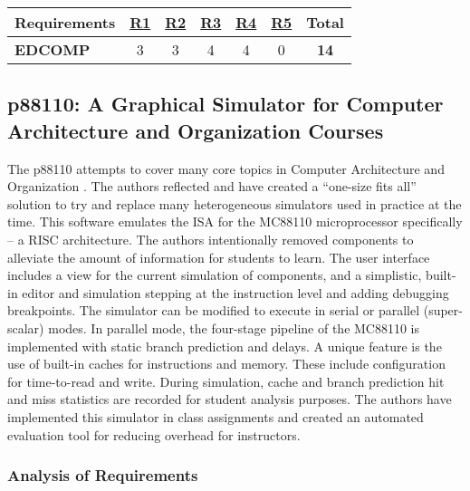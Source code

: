 \begin{table}[h!]
    \centering
    \begin{tabular}{lcccccc}
       \textbf{Requirements} & \textbf{\hyperref[req:personal]{R1}} & \textbf{\hyperref[req:configuration]{R2}} & \textbf{\hyperref[req:pedagogical]{R3}} & \textbf{\hyperref[req:simulations]{R4}} & \textbf{\hyperref[req:modern]{R5}} & \textbf{Total} \\ \hline
       \textbf{EDCOMP \cite{Djordjevic2005}} 
       & 3 & 3 & 4 & 4 & 0 & \textbf{14} \\ 
    \end{tabular}
\end{table}

\subsection{p88110: A Graphical Simulator for Computer Architecture and Organization Courses}
\label{sec:review-p88110}

The p88110 attempts to cover many core topics in Computer Architecture and Organization \cite{Garcia2009}. The authors reflected and have created a ``one-size fits all'' solution to try and replace many heterogeneous simulators used in practice at the time. This software emulates the ISA for the MC88110 microprocessor specifically -- a RISC architecture. The authors intentionally removed components to alleviate the amount of information for students to learn. The user interface includes a view for the current simulation of components, and a simplistic, built-in editor and simulation stepping at the instruction level and adding debugging breakpoints. The simulator can be modified to execute in serial or parallel (super-scalar) modes. In parallel mode, the four-stage pipeline of the MC88110 is implemented with static branch prediction and delays. A unique feature is the use of built-in caches for instructions and memory. These include configuration for time-to-read and write. During simulation, cache and branch prediction hit and miss statistics are recorded for student analysis purposes. The authors have implemented this simulator in class assignments and created an automated evaluation tool for reducing overhead for instructors. 

\subsubsection*{Analysis of Requirements}

